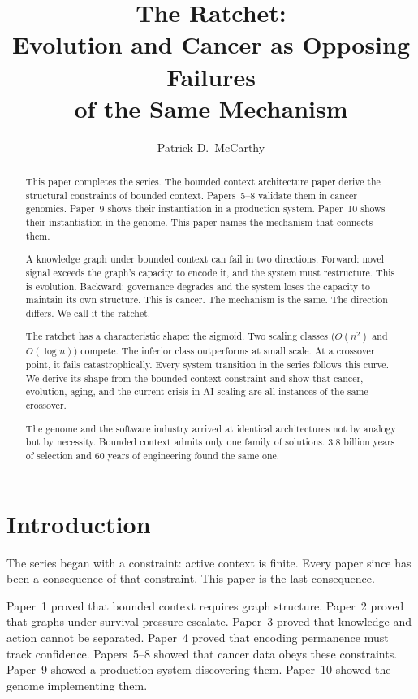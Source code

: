 \documentclass[11pt]{article}
\title{The Ratchet:\\Evolution and Cancer as Opposing Failures\\of the Same Mechanism}
\author{Patrick D.\ McCarthy}
\date{}
\theoremstyle{definition}
\begin{document}
\maketitle

\begin{abstract}
This paper completes the series. The bounded context architecture paper derive the structural
constraints of bounded context. Papers~5--8 validate them in cancer
genomics. Paper~9 shows their instantiation in a production system.
Paper~10 shows their instantiation in the genome. This paper names
the mechanism that connects them.

A knowledge graph under bounded context can fail in two directions.
Forward: novel signal exceeds the graph's capacity to encode it, and
the system must restructure. This is evolution. Backward: governance
degrades and the system loses the capacity to maintain its own
structure. This is cancer. The mechanism is the same. The direction
differs. We call it the ratchet.

The ratchet has a characteristic shape: the sigmoid. Two scaling
classes ($O(n^2)$ and $O(\log n)$) compete. The inferior class
outperforms at small scale. At a crossover point, it fails
catastrophically. Every system transition in the series follows
this curve. We derive its shape from the bounded context constraint
and show that cancer, evolution, aging, and the current crisis in
AI scaling are all instances of the same crossover.

The genome and the software industry arrived at identical
architectures not by analogy but by necessity. Bounded context
admits only one family of solutions. 3.8 billion years of selection
and 60 years of engineering found the same one.
\end{abstract}

\section{Introduction}
\label{sec:intro}

The series began with a constraint: active context is finite. Every
paper since has been a consequence of that constraint. This paper is
the last consequence.

Paper~1 proved that bounded context requires graph structure.
Paper~2 proved that graphs under survival pressure escalate.
Paper~3 proved that knowledge and action cannot be separated.
Paper~4 proved that encoding permanence must track confidence.
Papers~5--8 showed that cancer data obeys these constraints.
Paper~9 showed a production system discovering them.
Paper~10 showed the genome implementing them.
\end{document}
